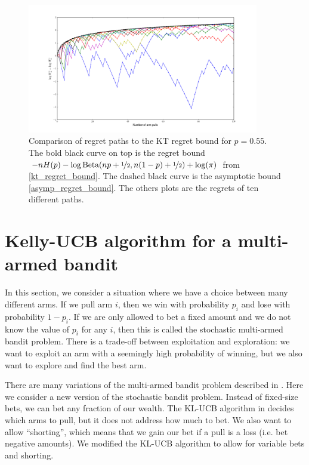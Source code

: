\documentclass[letterpaper]{article}
\numberwithin{equation}{section}
\theoremstyle{plain}
\begin{document}
\begin{figure}[ht]
\centering
\includegraphics[width=0.9\textwidth]{single_arm_kt_regret.png}
\caption{Comparison of regret paths to the KT regret bound for $p=0.55$. The bold black curve on top is the regret bound $-nH(p) -\log \text{Beta}(np+\nicefrac{1}{2}, n(1-p)+\nicefrac{1}{2}) + \log(\pi)$ from \eqref{kt_regret_bound}. The dashed black curve is the asymptotic bound \eqref{asymp_regret_bound}. The others plots are the regrets of ten different paths.}
\label{single_arm_regret_figure}
\end{figure}

\section{Kelly-UCB algorithm for a multi-armed bandit}\label{mab}
In this section, we consider a situation where we have a choice between many different arms. If we pull arm $i$, then we win with probability $p_i$ and lose with probability $1-p_i$. If we are only allowed to bet a fixed amount and we do not know the value of $p_i$ for any $i$, then this is called the stochastic multi-armed bandit problem. There is a trade-off between exploitation and exploration: we want to exploit an arm with a seemingly high probability of winning, but we also want to explore and find the best arm.

There are many variations of the multi-armed bandit problem described in \cite{bubeck2012regret}. Here we consider a new version of the stochastic bandit problem. Instead of fixed-size bets, we can bet any fraction of our wealth. The KL-UCB algorithm in \cite{cappe2013kullback} decides which arms to pull, but it does not address how much to bet. We also want to allow ``shorting'', which means that we gain our bet if a pull is a loss (i.e. bet negative amounts). We modified the KL-UCB algorithm to allow for variable bets and shorting.
\end{document}
